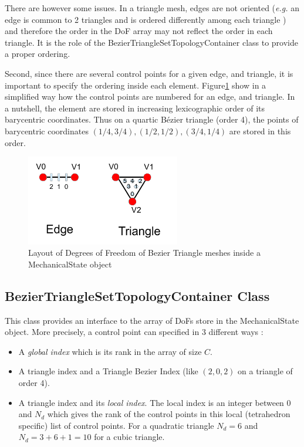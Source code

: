 \documentclass[a4paper,11pt]{article}
\newcommand{\Bezier}{{B{\'e}zier }}
\newcommand{\ncontrols}{{C}}
\newcommand{\degree}{{d}}
\begin{document}
There are however some issues. In a triangle mesh, edges are not oriented ({\em e.g.} an edge is common to 2 triangles and is ordered differently among each triangle ) and therefore the order in the DoF array may not reflect the order in each triangle. It is the role of the BezierTriangleSetTopologyContainer class to provide a proper ordering.

Second, since there are several control points for a given edge, and triangle, it is important to specify the ordering inside each element. Figure\ref{fig:DofBezierTriangleTesselation} show in a simplified way how the control points are numbered for an edge, and triangle. In a nutshell, the element are stored in increasing lexicographic order of its barycentric coordinates. Thus on a quartic \Bezier triangle (order 4), the points of barycentric coordinates $(1/4, 3/4), (1/2,1/2), (3/4, 1/4)$ are stored in this order.

\begin{figure}[!htbp]
	\centering
    \includegraphics[width=0.60\textwidth]{DofBezierTriangleTesselation}
	\caption{Layout of Degrees of Freedom of Bezier Triangle meshes inside a MechanicalState object}
	\label{fig:DofBezierTriangleTesselation}
\end{figure}

\subsection{BezierTriangleSetTopologyContainer Class}

This class provides an interface to the array of DoFs store in the MechanicalState object. More precisely, a control point can specified in 3 different ways :

\begin{itemize}
	\item A {\em global index} which is its rank in the array of size $\ncontrols$.
	\item A triangle index and a Triangle  Bezier Index (like $(2,0,2)$ on a triangle of order 4).
	\item A triangle index and its {\em local index}. The local index is an integer between 0 and $N_\degree$ which gives the rank of the control points in this local (tetrahedron specific) list of control points. For a quadratic triangle $N_d=6$ and $N_d=3+6+1=10$ for a cubic triangle.
 \end{itemize}
\end{document}
